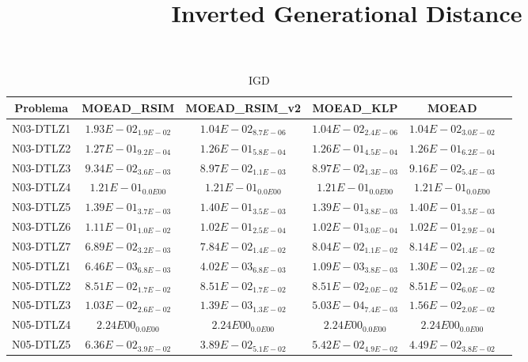 \documentclass{article}
\title{Inverted Generational Distance}
\author{}
\begin{document}
\maketitle
\begin{table*}[ht!]
\scriptsize
\caption{IGD}
\centering\begin{tabular}{|c||c||c||c||c||c|} \hline
Problema &MOEAD_RSIM &MOEAD_RSIM_v2 &MOEAD_KLP &MOEAD\\\hline
N03-DTLZ1 &$1.93E-02_{1.9E-02}$ &\cellcolor{gray25}$1.04E-02_{8.7E-06}$ &\cellcolor{gray95}$1.04E-02_{2.4E-06}$ &$1.04E-02_{3.0E-02}$\\ 
\hline
N03-DTLZ2 &$1.27E-01_{9.2E-04}$ &\cellcolor{gray25}$1.26E-01_{5.8E-04}$ &\cellcolor{gray95}$1.26E-01_{4.5E-04}$ &$1.26E-01_{6.2E-04}$\\ 
\hline
N03-DTLZ3 &$9.34E-02_{3.6E-03}$ &\cellcolor{gray95}$8.97E-02_{1.1E-03}$ &\cellcolor{gray25}$8.97E-02_{1.3E-03}$ &$9.16E-02_{5.4E-03}$\\ 
\hline
N03-DTLZ4 &\cellcolor{gray95}$1.21E-01_{0.0E00}$ &\cellcolor{gray25}$1.21E-01_{0.0E00}$ &$1.21E-01_{0.0E00}$ &$1.21E-01_{0.0E00}$\\ 
\hline
N03-DTLZ5 &\cellcolor{gray25}$1.39E-01_{3.7E-03}$ &$1.40E-01_{3.5E-03}$ &\cellcolor{gray95}$1.39E-01_{3.8E-03}$ &$1.40E-01_{3.5E-03}$\\ 
\hline
N03-DTLZ6 &$1.11E-01_{1.0E-02}$ &\cellcolor{gray25}$1.02E-01_{2.5E-04}$ &$1.02E-01_{3.0E-04}$ &\cellcolor{gray95}$1.02E-01_{2.9E-04}$\\ 
\hline
N03-DTLZ7 &\cellcolor{gray95}$6.89E-02_{3.2E-03}$ &\cellcolor{gray25}$7.84E-02_{1.4E-02}$ &$8.04E-02_{1.1E-02}$ &$8.14E-02_{1.4E-02}$\\ 
\hline
N05-DTLZ1 &$6.46E-03_{6.8E-03}$ &\cellcolor{gray25}$4.02E-03_{6.8E-03}$ &\cellcolor{gray95}$1.09E-03_{3.8E-03}$ &$1.30E-02_{1.2E-02}$\\ 
\hline
N05-DTLZ2 &\cellcolor{gray95}$8.51E-02_{1.7E-02}$ &\cellcolor{gray25}$8.51E-02_{1.7E-02}$ &$8.51E-02_{2.0E-02}$ &$8.51E-02_{6.0E-02}$\\ 
\hline
N05-DTLZ3 &$1.03E-02_{2.6E-02}$ &\cellcolor{gray25}$1.39E-03_{1.3E-02}$ &\cellcolor{gray95}$5.03E-04_{7.4E-03}$ &$1.56E-02_{2.0E-02}$\\ 
\hline
N05-DTLZ4 &\cellcolor{gray95}$2.24E00_{0.0E00}$ &\cellcolor{gray25}$2.24E00_{0.0E00}$ &$2.24E00_{0.0E00}$ &$2.24E00_{0.0E00}$\\ 
\hline
N05-DTLZ5 &$6.36E-02_{3.9E-02}$ &\cellcolor{gray95}$3.89E-02_{5.1E-02}$ &$5.42E-02_{4.9E-02}$ &\cellcolor{gray25}$4.49E-02_{3.8E-02}$\\ 

\end{tabular}
\end{table*}
\end{document}
